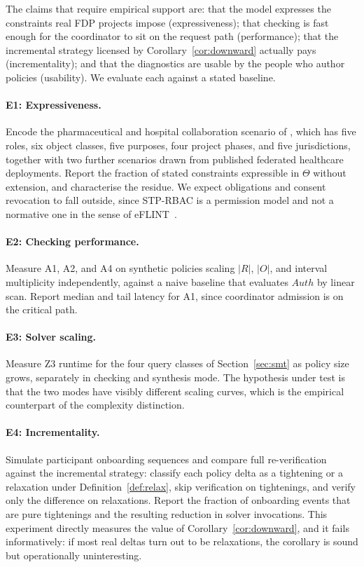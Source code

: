 \documentclass[11pt]{article}
\theoremstyle{definition}
\theoremstyle{plain}
\theoremstyle{remark}
\newcommand{\Auth}{\mathit{Auth}}
\begin{document}
The claims that require empirical support are: that the model expresses the
constraints real FDP projects impose (expressiveness); that checking is fast
enough for the coordinator to sit on the request path (performance); that the
incremental strategy licensed by Corollary~\ref{cor:downward} actually pays
(incrementality); and that the diagnostics are usable by the people who author
policies (usability). We evaluate each against a stated baseline.

\paragraph{E1: Expressiveness.} Encode the pharmaceutical and hospital
collaboration scenario of \citet{kokash2026compliance}, which has five roles,
six object classes, five purposes, four project phases, and five jurisdictions,
together with two further scenarios drawn from published federated healthcare
deployments. Report the fraction of stated constraints expressible in $\Theta$
without extension, and characterise the residue. We expect obligations and
consent revocation to fall outside, since STP-RBAC is a permission model and not
a normative one in the sense of eFLINT~\citep{binsbergen2020eflint}.

\paragraph{E2: Checking performance.} Measure A1, A2, and A4 on synthetic
policies scaling $|R|$, $|O|$, and interval multiplicity independently, against
a naive baseline that evaluates $\Auth$ by linear scan. Report median and
tail latency for A1, since coordinator admission is on the critical path.

\paragraph{E3: Solver scaling.} Measure Z3 runtime for the four query classes of
Section~\ref{sec:smt} as policy size grows, separately in checking and synthesis
mode. The hypothesis under test is that the two modes have visibly different
scaling curves, which is the empirical counterpart of the complexity
distinction.

\paragraph{E4: Incrementality.} Simulate participant onboarding sequences and
compare full re-verification against the incremental strategy: classify each
policy delta as a tightening or a relaxation under Definition~\ref{def:relax},
skip verification on tightenings, and verify only the difference on relaxations.
Report the fraction of onboarding events that are pure tightenings and the
resulting reduction in solver invocations. This experiment directly measures the
value of Corollary~\ref{cor:downward}, and it fails informatively: if most real
deltas turn out to be relaxations, the corollary is sound but operationally
uninteresting.
\end{document}
